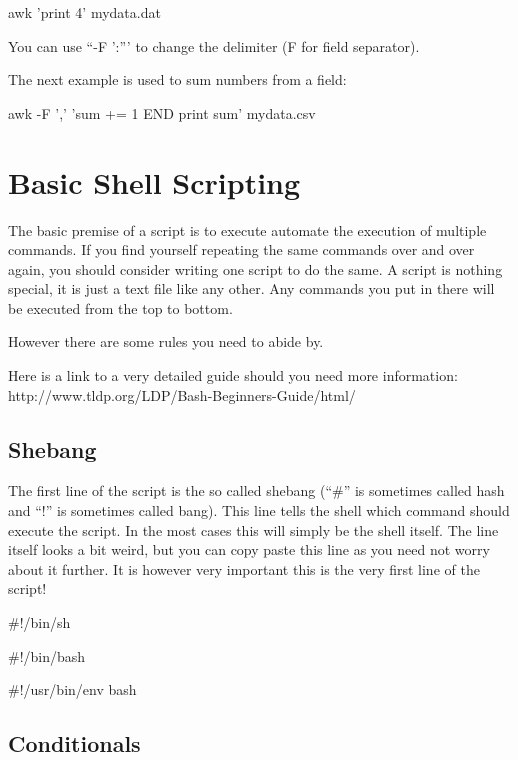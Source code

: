 \begin{prompt}
    awk '{print $$4}' mydata.dat
\end{prompt}

You can use ``-F ':''' to change the delimiter (F for field separator).

The next example is used to sum numbers from a field:

\begin{prompt}
    awk -F ',' '{sum += $$1} END {print sum}' mydata.csv
\end{prompt}

\section{Basic Shell Scripting}

The basic premise of a script is to execute automate the execution of multiple commands. If you find yourself repeating the same commands over and over again, you should consider writing one script to do the same.
A script is nothing special, it is just a text file like any other. Any commands you put in there will be executed from the top to bottom.

However there are some rules you need to abide by.

Here is a link to a very detailed guide should you need more information: http://www.tldp.org/LDP/Bash-Beginners-Guide/html/

\subsection{Shebang}
The first line of the script is the so called shebang (``#'' is sometimes called hash and ``!'' is sometimes called bang). This line tells the shell which command should execute the script. In the most cases this will simply be the shell itself. The line itself looks a bit weird, but you can copy paste this line as you need not worry about it further. It is however very important this is the very first line of the script!

\begin{prompt}
 #!/bin/sh

 #!/bin/bash

 #!/usr/bin/env bash
\end{prompt}

\subsection{Conditionals}

